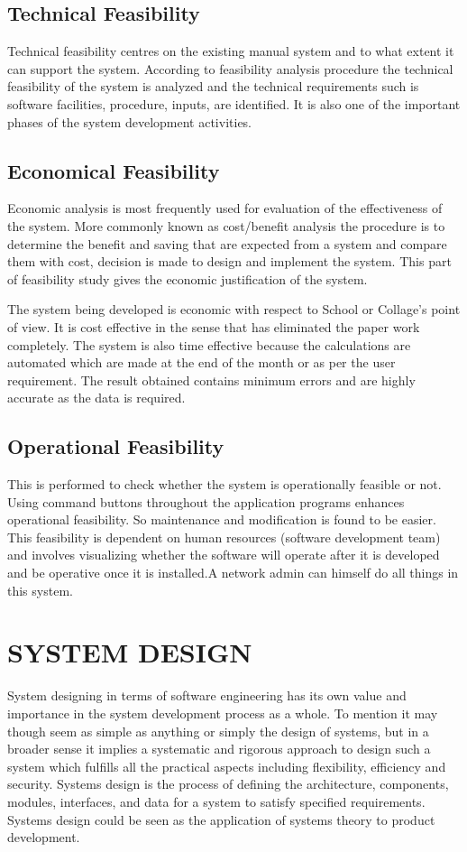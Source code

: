 \section{Technical Feasibility}
     Technical feasibility centres on the existing manual system and to what extent it can support the system. According to feasibility analysis procedure the technical feasibility of the system is analyzed and the technical requirements such is software facilities, procedure, inputs, are identified. It is also one of the important phases of the system development activities.
%
\section{Economical Feasibility}
 Economic analysis is most frequently used for evaluation of the effectiveness of the system. More commonly known as cost/benefit analysis the procedure is to determine the benefit and saving that are expected from a system and compare them with cost, decision is made to design and implement the system. This part of feasibility study gives the economic justification of the system.     
 
         The system being developed is economic with respect to School or Collage’s point of view. It is cost effective in the sense that has eliminated the paper work completely. The system is also time effective because the calculations are automated which are made at the end of the month or as per the user requirement. The result obtained contains minimum errors and are highly accurate as the data is required. 
%
\section{Operational Feasibility}
 This is performed to check whether the system is operationally feasible or not. Using command buttons throughout the application programs enhances operational feasibility. So maintenance and modification is found to be easier. This feasibility is dependent on human resources (software development team) and involves visualizing whether the software will operate after it is developed and be operative once it is installed.A network admin can himself do all things in this system.
%
\chapter{SYSTEM DESIGN }
System designing in terms of software engineering has its own value and importance in the system development process as a whole. To mention it may though seem as simple as anything or simply the design of systems, but in a broader sense it implies a systematic and rigorous approach to design such a system which fulfills all the practical aspects including flexibility, efficiency and security. Systems design is the process of defining the architecture, components, modules, interfaces, and data for a system to satisfy specified requirements. Systems design could be seen as the application of systems theory to product development.

